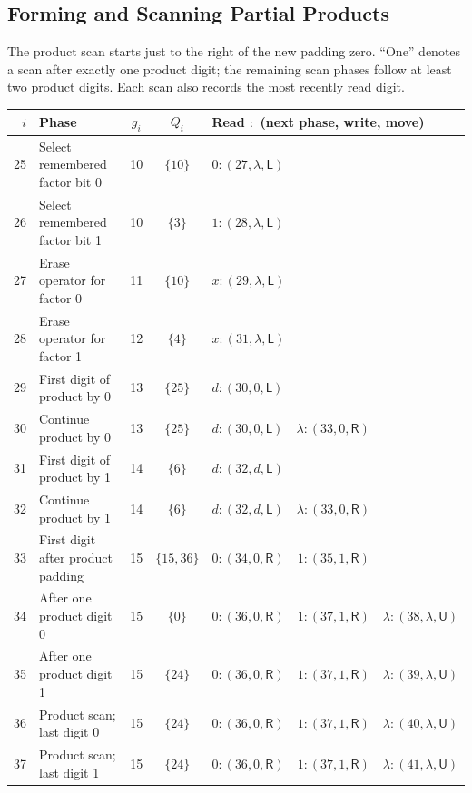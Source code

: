 \documentclass[11pt,a4paper]{article}
\newcommand{\blank}{\lambda}
\newcommand{\triple}[3]{(#1,#2,\mathsf{#3})}
\begin{document}
\newpage
\subsection{Forming and Scanning Partial Products}\label{sec:part4}
The product scan starts just to the right of the new padding zero.
``One'' denotes a scan after exactly one product digit; the remaining
scan phases follow at least two product digits. Each scan also records the most recently read digit.

\begin{center}
\fontsize{9.2}{11}\selectfont\renewcommand{\arraystretch}{1.21}
\setlength{\tabcolsep}{4pt}
\begin{tabularx}{\textwidth}{r p{5.5cm} c c X}
\toprule\rowcolor{Pale}$i$ & Phase & $g_i$ & $Q_i$ & Read $:$ (next phase, write, move)\\\midrule
25 & Select remembered factor bit 0 & 10 & $\{10\}$ & $0:\triple{27}{\blank}{L}$ \\
26 & Select remembered factor bit 1 & 10 & $\{3\}$ & $1:\triple{28}{\blank}{L}$ \\
27 & Erase operator for factor 0 & 11 & $\{10\}$ & $x:\triple{29}{\blank}{L}$ \\
28 & Erase operator for factor 1 & 12 & $\{4\}$ & $x:\triple{31}{\blank}{L}$ \\
29 & First digit of product by 0 & 13 & $\{25\}$ & $d:\triple{30}{0}{L}$ \\
30 & Continue product by 0 & 13 & $\{25\}$ & $d:\triple{30}{0}{L}\quad \blank:\triple{33}{0}{R}$ \\
31 & First digit of product by 1 & 14 & $\{6\}$ & $d:\triple{32}{d}{L}$ \\
32 & Continue product by 1 & 14 & $\{6\}$ & $d:\triple{32}{d}{L}\quad \blank:\triple{33}{0}{R}$ \\
33 & First digit after product padding & 15 & $\{15,36\}$ & $0:\triple{34}{0}{R}\quad 1:\triple{35}{1}{R}$ \\
34 & After one product digit 0 & 15 & $\{0\}$ & $0:\triple{36}{0}{R}\quad 1:\triple{37}{1}{R}\quad \blank:\triple{38}{\blank}{U}$ \\
35 & After one product digit 1 & 15 & $\{24\}$ & $0:\triple{36}{0}{R}\quad 1:\triple{37}{1}{R}\quad \blank:\triple{39}{\blank}{U}$ \\
36 & Product scan; last digit 0 & 15 & $\{24\}$ & $0:\triple{36}{0}{R}\quad 1:\triple{37}{1}{R}\quad \blank:\triple{40}{\blank}{U}$ \\
37 & Product scan; last digit 1 & 15 & $\{24\}$ & $0:\triple{36}{0}{R}\quad 1:\triple{37}{1}{R}\quad \blank:\triple{41}{\blank}{U}$ \\

\end{tabularx}
\end{center}
\end{document}
